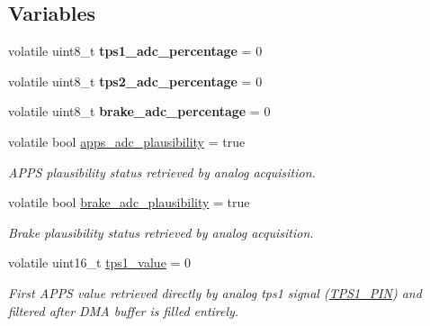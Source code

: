 \subsection*{Variables}
\begin{DoxyCompactItemize}
\item 
\mbox{\label{group___board__model__group_ga7c7f5690cca986bc3fb2f6dcbda24690}} 
volatile uint8\+\_\+t {\bfseries tps1\+\_\+adc\+\_\+percentage} = 0
\item 
\mbox{\label{group___board__model__group_gae1f465253d690605c0948394a3f055f4}} 
volatile uint8\+\_\+t {\bfseries tps2\+\_\+adc\+\_\+percentage} = 0
\item 
\mbox{\label{group___board__model__group_ga709add26e40f60e3add32981ea2a5868}} 
volatile uint8\+\_\+t {\bfseries brake\+\_\+adc\+\_\+percentage} = 0
\item 
\mbox{\label{group___board__model__group_ga3e919d1e6477d52b4ccddd497351d3ec}} 
volatile bool \mbox{\hyperlink{group___board__model__group_ga3e919d1e6477d52b4ccddd497351d3ec}{apps\+\_\+adc\+\_\+plausibility}} = true
\begin{DoxyCompactList}\small\item\em A\+P\+PS plausibility status retrieved by analog acquisition. \end{DoxyCompactList}\item 
\mbox{\label{group___board__model__group_gaf6aa7f974533c4306128757d0634572a}} 
volatile bool \mbox{\hyperlink{group___board__model__group_gaf6aa7f974533c4306128757d0634572a}{brake\+\_\+adc\+\_\+plausibility}} = true
\begin{DoxyCompactList}\small\item\em Brake plausibility status retrieved by analog acquisition. \end{DoxyCompactList}\item 
\mbox{\label{group___board__model__group_ga3d6043851868b7da3c1d6381f835a559}} 
volatile uint16\+\_\+t \mbox{\hyperlink{group___board__model__group_ga3d6043851868b7da3c1d6381f835a559}{tps1\+\_\+value}} = 0
\begin{DoxyCompactList}\small\item\em First A\+P\+PS value retrieved directly by analog tps1 signal (\mbox{\hyperlink{group___board__model__group_gae9aa914854f611488701c96a330b0bd4}{T\+P\+S1\+\_\+\+P\+IN}}) and filtered after D\+MA buffer is filled entirely. \end{DoxyCompactList}\item 

\end{DoxyCompactItemize}
